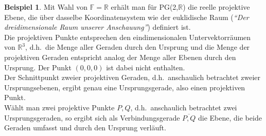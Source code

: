\documentclass[hidelinks]{article}
\theoremstyle{plain}
\theoremstyle{definition}
\newtheorem{bsp}[thm]{Beispiel}
\theoremstyle{rem}
\begin{document}
\begin{sloppypar}
\begin{bsp}
Mit Wahl von $\mathbb{F}=\mathbb{R}$ erhält man für PG(2,$\mathbb{R}$) die reelle projektive Ebene, die über dasselbe Koordinatensystem wie der euklidische Raum (\textit{``Der dreidimensionale Raum unserer Anschauung''}) definiert ist.\\
Die projektiven Punkte entsprechen den eindimensionalen Untervektorräumen von $\mathbb{R}^3$, d.h.\ die Menge aller Geraden durch den Ursprung und die Menge der projektiven Geraden entspricht analog der Menge aller Ebenen durch den Ursprung. Der Punkt $(0,0,0)$ ist dabei nicht enthalten.\\
Der Schnittpunkt zweier projektiven Geraden, d.h.\ anschaulich betrachtet zweier Ursprungsebenen, ergibt genau eine Ursprungsgerade, also einen projektiven Punkt.\\
Wählt man zwei projektive Punkte $P,Q$, d.h.\ anschaulich betrachtet zwei Ursprungsgeraden, so ergibt sich als Verbindungsgerade $\overline{P,Q}$ die Ebene, die beide Geraden umfasst und durch den Ursprung verläuft.

\begin{figure}[H]
\qquad	
{}
\end{figure}
\end{bsp}
\end{sloppypar}
\end{document}
